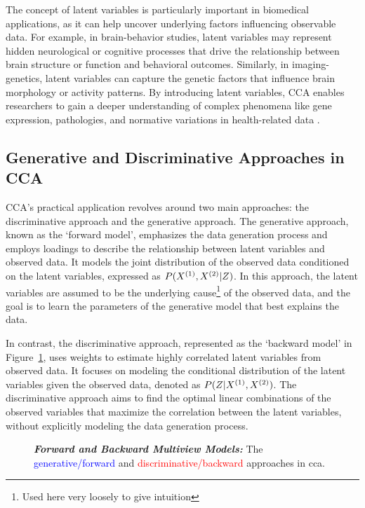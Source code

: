 The concept of latent variables is particularly important in biomedical applications, as it can help uncover underlying factors influencing observable data. For example, in brain-behavior studies, latent variables may represent hidden neurological or cognitive processes that drive the relationship between brain structure or function and behavioral outcomes. Similarly, in imaging-genetics, latent variables can capture the genetic factors that influence brain morphology or activity patterns. By introducing latent variables, CCA enables researchers to gain a deeper understanding of complex phenomena like gene expression, pathologies, and normative variations in health-related data \citep{lawry2023multi}.

\subsection{Generative and Discriminative Approaches in CCA}

CCA's practical application revolves around two main approaches: the discriminative approach and the generative approach. 
The generative approach, known as the `forward model', emphasizes the data generation process and employs loadings to describe the relationship between latent variables and observed data. It models the joint distribution of the observed data conditioned on the latent variables, expressed as $P(X^{(1)},X^{(2)}|Z)$. In this approach, the latent variables are assumed to be the underlying cause\footnote{Used here very loosely to give intuition} of the observed data, and the goal is to learn the parameters of the generative model that best explains the data.

In contrast, the discriminative approach, represented as the `backward model' in Figure~\ref{fig:forward-backward-models}, uses weights to estimate highly correlated latent variables from observed data. It focuses on modeling the conditional distribution of the latent variables given the observed data, denoted as $P(Z|X^{(1)},X^{(2)})$. The discriminative approach aims to find the optimal linear combinations of the observed variables that maximize the correlation between the latent variables, without explicitly modeling the data generation process.

\begin{figure}
    \centering
    \caption[Forward and Backward Multiview Models]{\textit{\textbf{Forward and Backward Multiview Models:}} The \textcolor{blue}{generative/forward} and \textcolor{red}{discriminative/backward} approaches in \acrshort{cca}.}\label{fig:forward-backward-models}
\end{figure}

